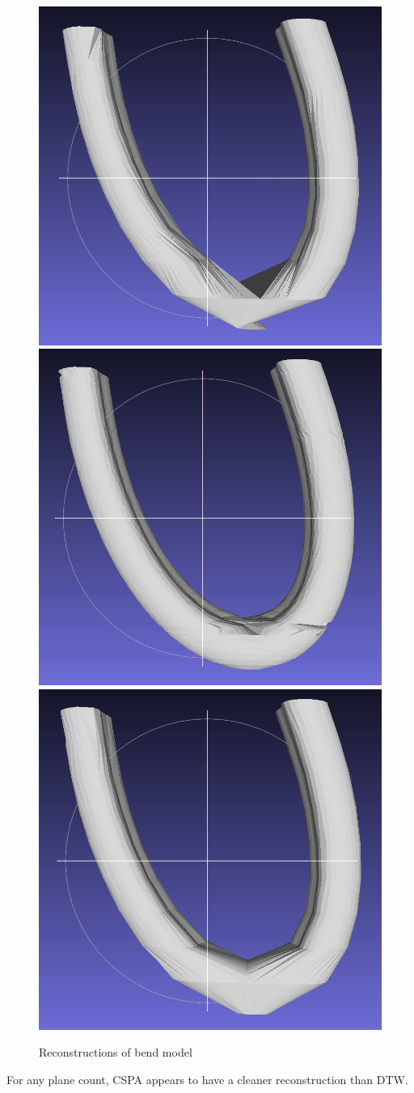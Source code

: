 \documentclass[11p, titlepage]{article}
\begin{document}
\begin{figure}[h]
\begin{minipage}[b]{.6\linewidth}
       \hfill
       {\includegraphics[width=.48\linewidth]{reconstructions/dtw-bend-10}}
       \hfill
       {\includegraphics[width=.48\linewidth]{reconstructions/cspa50-bend-50}}%
       \hfill
       {\includegraphics[width=.48\linewidth]{reconstructions/cspa50-bend-10}}
     \end{minipage}%
        \caption{Reconstructions of bend model}
        \label{fig:bend_reconstructions}
\end{figure}

For any plane count, CSPA appears to have a cleaner reconstruction than DTW.
\end{document}
